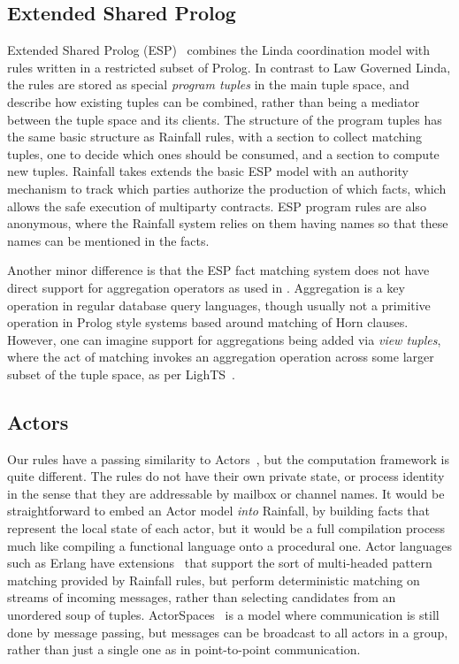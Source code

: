 \subsection{Extended Shared Prolog}
Extended Shared Prolog (ESP)~\cite{Ciancarini1993:Coordinating, Ciancarini1994:LogicTupleSpaces} combines the Linda coordination model with rules written in a restricted subset of Prolog. In contrast to Law Governed Linda, the rules are stored as special \emph{program tuples} in the main tuple space, and describe how existing tuples can be combined, rather than being a mediator between the tuple space and its clients. The structure of the program tuples has the same basic structure as Rainfall rules, with a section to collect matching tuples, one to decide which ones should be consumed, and a section to compute new tuples. Rainfall takes extends the basic ESP model with an authority mechanism to track which parties authorize the production of which facts, which allows the safe execution of multiparty contracts. ESP program rules are also anonymous, where the Rainfall system relies on them having names so that these names can be mentioned in the facts.

Another minor difference is that the ESP fact matching system does not have direct support for aggregation operators as used in \REF. Aggregation is a key operation in regular database query languages, though usually not a primitive operation in Prolog style systems based around matching of Horn clauses. However, one can imagine support for aggregations being added via \emph{view tuples}, where the act of matching invokes an aggregation operation across some larger subset of the tuple space, as per LighTS~\cite{Balzarotti2007:LighTS}.



\subsection{Actors}
Our rules have a passing similarity to Actors~\cite{Agha92:ActorTheory}, but the computation framework is quite different. The rules do not have their own private state, or process identity in the sense that they are addressable by mailbox or channel names. It would be straightforward to embed an Actor model \emph{into} Rainfall, by building facts that represent the local state of each actor, but it would be a full compilation process much like compiling a functional language onto a procedural one. Actor languages such as Erlang have extensions~\cite{Sulzmann2008:MultiHeaded} that support the sort of multi-headed pattern matching provided by Rainfall rules, but perform deterministic matching on streams of incoming messages, rather than selecting candidates from an unordered soup of tuples. ActorSpaces~\cite{Agha1993:ActorSpace} is a model where communication is still done by message passing, but messages can be broadcast to all actors in a group, rather than just a single one as in point-to-point communication.

